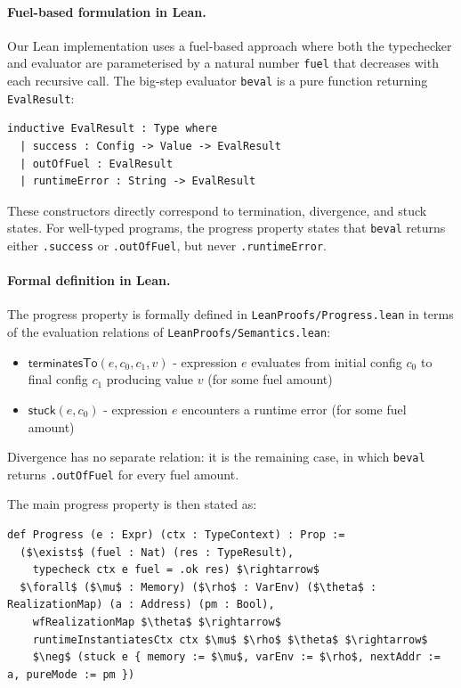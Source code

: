 \documentclass[12pt]{article}
\begin{document}
\paragraph{Fuel-based formulation in Lean.} Our Lean implementation uses a
fuel-based approach where both the typechecker and evaluator are parameterised
by a natural number \texttt{fuel} that decreases with each recursive call. The
big-step evaluator \texttt{beval} is a pure function returning \texttt{EvalResult}:

\begin{lstlisting}[language=caml]
inductive EvalResult : Type where
  | success : Config -> Value -> EvalResult
  | outOfFuel : EvalResult
  | runtimeError : String -> EvalResult
\end{lstlisting}

These constructors directly correspond to termination, divergence, and stuck
states. For well-typed programs, the progress property states that
\texttt{beval} returns either \texttt{.success} or \texttt{.outOfFuel}, but
never \texttt{.runtimeError}.

\paragraph{Formal definition in Lean.} The progress property is formally defined
in \texttt{LeanProofs/Progress.lean} in terms of the evaluation relations of
\texttt{LeanProofs/Semantics.lean}:

\begin{itemize}
    \item $\mathsf{terminatesTo}(e, c_0, c_1, v)$ - expression $e$ evaluates from initial config $c_0$ to final config $c_1$ producing value $v$ (for some fuel amount)
    \item $\mathsf{stuck}(e, c_0)$ - expression $e$ encounters a runtime error (for some fuel amount)
\end{itemize}

Divergence has no separate relation: it is the remaining case, in which
\texttt{beval} returns \texttt{.outOfFuel} for every fuel amount.

The main progress property is then stated as:

\begin{lstlisting}[language=caml,mathescape=true]
def Progress (e : Expr) (ctx : TypeContext) : Prop :=
  ($\exists$ (fuel : Nat) (res : TypeResult),
    typecheck ctx e fuel = .ok res) $\rightarrow$
  $\forall$ ($\mu$ : Memory) ($\rho$ : VarEnv) ($\theta$ : RealizationMap) (a : Address) (pm : Bool),
    wfRealizationMap $\theta$ $\rightarrow$
    runtimeInstantiatesCtx ctx $\mu$ $\rho$ $\theta$ $\rightarrow$
    $\neg$ (stuck e { memory := $\mu$, varEnv := $\rho$, nextAddr := a, pureMode := pm })
\end{lstlisting}
\end{document}

